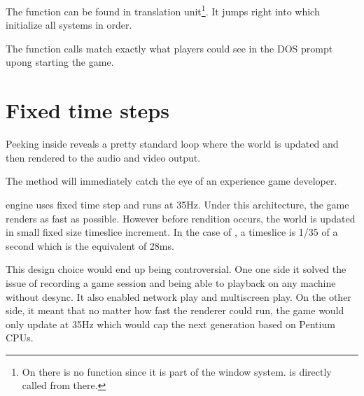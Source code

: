\par


The  function can be found in  translation unit\footnote{On \NeXT there is no  function since it is part of the window system.  is directly called from there.}. It jumps right into  which initialize all systems in order.\\
\par
{}
\pagebreak

The function calls match exactly what players could see in the DOS prompt upong starting the game.\\
\par
{}
\par
{}

\section{Fixed time steps}
Peeking inside  reveals a pretty standard loop where the world is updated and then rendered to the audio and video output.\\
\par
{}
The method  will immediately catch the eye of an experience game developer.\\
\par
{}
\par
\doom engine uses fixed time step and runs at 35Hz. Under this architecture, the game renders as fast as possible. However before rendition occurs, the world is updated in small fixed size timeslice increment. In the case of \doom, a timeslice is 1/35 of a second which is the equivalent of 28ms.\\
\par
{}
\par
This design choice would end up being controversial. One one side it solved the issue of recording a game session and being able to playback on any machine without desync. It also enabled network play and multiscreen play. On the other side, it meant that no matter how fast the renderer could run, the game would only update at 35Hz which would cap the next generation based on Pentium CPUs.\\
\par



